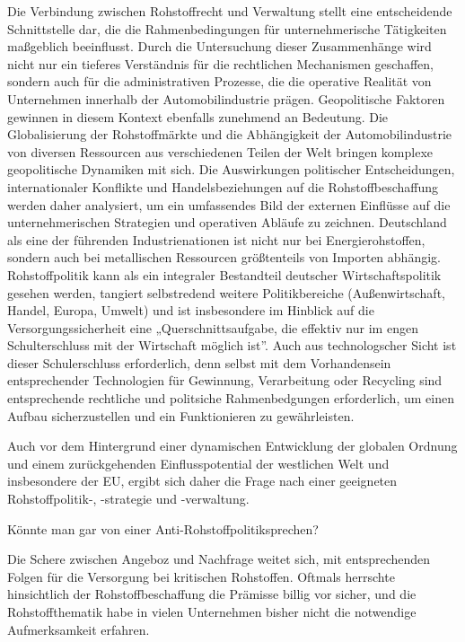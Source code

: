 \documentclass[12pt,a4paper,oneside]{book} %
\begin{document}
	Die Verbindung zwischen Rohstoffrecht und Verwaltung stellt eine entscheidende Schnittstelle dar, die die Rahmenbedingungen für unternehmerische Tätigkeiten maßgeblich beeinflusst. Durch die Untersuchung dieser Zusammenhänge wird nicht nur ein tieferes Verständnis für die rechtlichen Mechanismen geschaffen, sondern auch für die administrativen Prozesse, die die operative Realität von Unternehmen innerhalb der Automobilindustrie prägen. Geopolitische Faktoren gewinnen in diesem Kontext ebenfalls zunehmend an Bedeutung. Die Globalisierung der Rohstoffmärkte und die Abhängigkeit der Automobilindustrie von diversen Ressourcen aus verschiedenen Teilen der Welt bringen komplexe geopolitische Dynamiken mit sich. Die Auswirkungen politischer Entscheidungen, internationaler Konflikte und Handelsbeziehungen auf die Rohstoffbeschaffung werden daher analysiert, um ein umfassendes Bild der externen Einflüsse auf die unternehmerischen Strategien und operativen Abläufe zu zeichnen. Deutschland als eine der führenden Industrienationen ist nicht nur bei Energierohstoffen, sondern auch bei metallischen Ressourcen größtenteils von Importen abhängig. \autocite{dauke_rohstoff-_2011} Rohstoffpolitik kann als ein integraler Bestandteil deutscher Wirtschaftspolitik gesehen werden, tangiert selbstredend weitere Politikbereiche (Außenwirtschaft, Handel, Europa, Umwelt) und ist insbesondere im Hinblick auf die Versorgungssicherheit eine „Querschnittsaufgabe, die effektiv nur im engen Schulterschluss mit der Wirtschaft möglich ist”.\autocite{dauke_rohstoff-_2011} Auch aus technologscher Sicht ist dieser Schulerschluss erforderlich, denn selbst mit dem Vorhandensein entsprechender Technologien für Gewinnung, Verarbeitung oder Recycling sind entsprechende rechtliche und politsiche Rahmenbedgungen erforderlich, um einen Aufbau sicherzustellen und ein Funktionieren zu gewährleisten.
	
	Auch vor dem Hintergrund einer dynamischen Entwicklung der globalen Ordnung und einem zurückgehenden Einflusspotential der westlichen Welt und insbesondere der EU, ergibt sich daher die Frage nach einer geeigneten Rohstoffpolitik-, -strategie und -verwaltung.
	
	Könnte man gar von einer \glqq Anti-Rohstoffpolitik\grqq sprechen?
	
	Die Schere zwischen Angeboz und Nachfrage weitet sich, mit entsprechenden Folgen für die Versorgung bei kritischen Rohstoffen. Oftmals herrschte hinsichtlich der Rohstoffbeschaffung die Prämisse \glqq billig vor sicher\grqq, und die Rohstoffthematik habe in vielen Unternehmen bisher nicht die notwendige Aufmerksamkeit erfahren.\autocite{SZ, Der Stoff, aus dem die Waffen sind, 28.08.2026, Seite 3}
	
\end{document}
